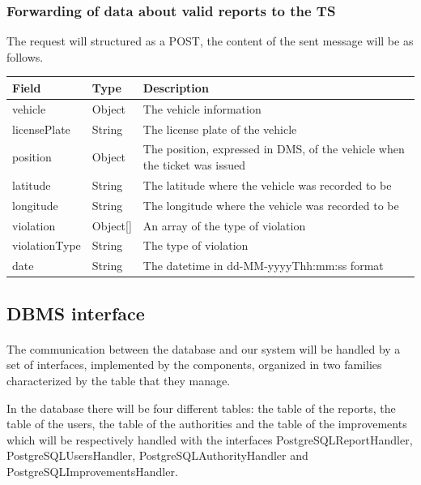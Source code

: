 					\subsubsection{Forwarding of data about valid reports to the TS}
						The request will structured as a POST, the content of the sent message will be as follows.
						\begin{table}[!h]
						\begin{tabular}{L{0.23\textwidth}L{0.15\textwidth}L{0.42\textwidth}}
							\toprule
							\textbf{Field} & \textbf{Type} & \textbf{Description} \\
							\midrule
							vehicle & Object & The vehicle information \\
							\hspace{2.5mm}licensePlate & String & The license plate of the vehicle \\
							position & Object & The position, expressed in DMS, of the vehicle when the ticket was issued  \\
							\hspace{2.5mm}latitude & String & The latitude where the vehicle was recorded to be \\
							\hspace{2.5mm}longitude & String & The longitude where the vehicle was recorded to be \\
							violation & Object[] & An array of the type of violation \\
							\hspace{2.5mm}violationType & String & The type of violation \\
							date & String & The datetime in \newline dd-MM-yyyyThh:mm:ss format \\
								 	\bottomrule
								\end{tabular}
							\end{table}
			\clearpage
			\subsection{DBMS interface}
				\paragraph{}
					The communication between the database and our system will be handled by a set of interfaces, implemented by the components, organized in two families characterized by the table that they manage. 
					
					In the database there will be four different tables: the table of the reports, the table of the users, the table of the authorities and the table of the improvements which will be respectively handled with the interfaces PostgreSQLReportHandler, PostgreSQLUsersHandler, PostgreSQLAuthorityHandler and PostgreSQLImprovementsHandler.
